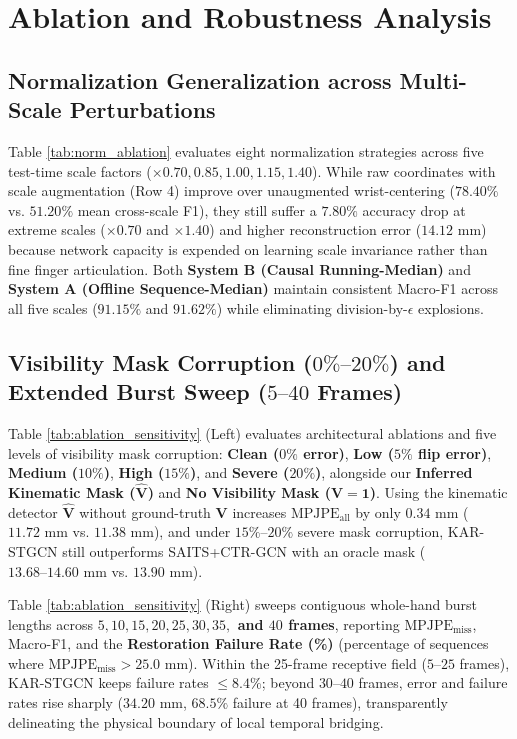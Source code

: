 \documentclass[10pt,twocolumn]{article}
\begin{document}
\section{Ablation and Robustness Analysis}
\subsection{Normalization Generalization across Multi-Scale Perturbations}
Table \ref{tab:norm_ablation} evaluates eight normalization strategies across five test-time scale factors ($\times 0.70, 0.85, 1.00, 1.15, 1.40$). While raw coordinates with scale augmentation (Row 4) improve over unaugmented wrist-centering ($78.40\%$ vs. $51.20\%$ mean cross-scale F1), they still suffer a $7.80\%$ accuracy drop at extreme scales ($\times 0.70$ and $\times 1.40$) and higher reconstruction error ($14.12\text{ mm}$) because network capacity is expended on learning scale invariance rather than fine finger articulation. Both \textbf{System B (Causal Running-Median)} and \textbf{System A (Offline Sequence-Median)} maintain consistent Macro-F1 across all five scales ($91.15\%$ and $91.62\%$) while eliminating division-by-$\epsilon$ explosions.

\subsection{Visibility Mask Corruption ($0\%\text{--}20\%$) and Extended Burst Sweep ($5\text{--}40$ Frames)}
Table \ref{tab:ablation_sensitivity} (Left) evaluates architectural ablations and five levels of visibility mask corruption: \textbf{Clean ($0\%$ error)}, \textbf{Low ($5\%$ flip error)}, \textbf{Medium ($10\%$)}, \textbf{High ($15\%$)}, and \textbf{Severe ($20\%$)}, alongside our \textbf{Inferred Kinematic Mask ($\hat{\mathbf{V}}$)} and \textbf{No Visibility Mask ($\mathbf{V}=\mathbf{1}$)}. Using the kinematic detector $\hat{\mathbf{V}}$ without ground-truth $\mathbf{V}$ increases $\text{MPJPE}_{\text{all}}$ by only $0.34\text{ mm}$ ($11.72\text{ mm}$ vs. $11.38\text{ mm}$), and under $15\%\text{--}20\%$ severe mask corruption, KAR-STGCN still outperforms SAITS+CTR-GCN with an oracle mask ($13.68\text{--}14.60\text{ mm}$ vs. $13.90\text{ mm}$).

Table \ref{tab:ablation_sensitivity} (Right) sweeps contiguous whole-hand burst lengths across \textbf{$5, 10, 15, 20, 25, 30, 35,$ and $40$ frames}, reporting $\text{MPJPE}_{\text{miss}}$, Macro-F1, and the \textbf{Restoration Failure Rate (\%)} (percentage of sequences where $\text{MPJPE}_{\text{miss}} > 25.0\text{ mm}$). Within the 25-frame receptive field ($5\text{--}25$ frames), KAR-STGCN keeps failure rates $\le 8.4\%$; beyond $30\text{--}40$ frames, error and failure rates rise sharply ($34.20\text{ mm}$, $68.5\%$ failure at 40 frames), transparently delineating the physical boundary of local temporal bridging.
\end{document}
